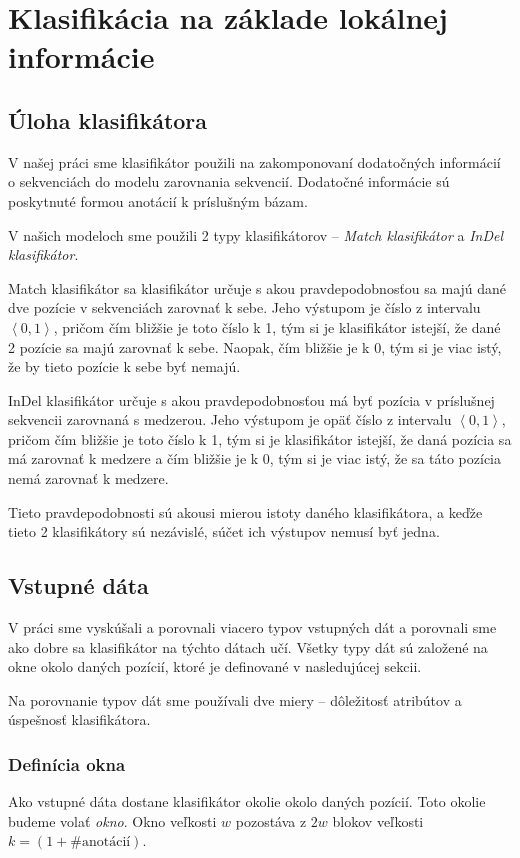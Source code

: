 \chapter[Klasifikácia]{Klasifikácia na základe lokálnej informácie}

\section{Úloha klasifikátora}

V našej práci sme klasifikátor použili na zakomponovaní dodatočných informácií o sekvenciách do modelu zarovnania sekvencií. Dodatočné informácie sú poskytnuté formou anotácií k príslušným bázam.

V našich modeloch sme použili 2 typy klasifikátorov -- \textit{Match klasifikátor} a \textit{InDel klasifikátor}.

Match klasifikátor sa klasifikátor určuje s akou pravdepodobnosťou sa majú dané dve pozície v sekvenciách zarovnať k sebe. Jeho výstupom je číslo z intervalu $\left<0,1\right>$, pričom čím bližšie je toto číslo k 1, tým si je klasifikátor istejší, že dané 2 pozície sa majú zarovnať k sebe. Naopak, čím bližšie je k 0, tým si je viac istý, že by tieto pozície k sebe byť nemajú.

InDel klasifikátor určuje s akou pravdepodobnosťou má byť pozícia v príslušnej sekvencii zarovnaná s medzerou. Jeho výstupom je opäť  číslo z intervalu $\left<0,1\right>$, pričom čím bližšie je toto číslo k 1, tým si je klasifikátor istejší, že daná pozícia sa má zarovnať k medzere a čím bližšie je k 0, tým si je viac istý, že sa táto pozícia nemá zarovnať k medzere.

Tieto pravdepodobnosti sú akousi mierou istoty daného klasifikátora, a keďže tieto 2 klasifikátory sú nezávislé, súčet ich výstupov nemusí byť jedna.

\section{Vstupné dáta}

V práci sme vyskúšali a porovnali viacero typov vstupných dát a porovnali sme ako dobre sa klasifikátor na týchto dátach učí. Všetky typy dát sú založené na okne okolo daných pozícií, ktoré je definované v nasledujúcej sekcii.

Na porovnanie typov dát sme používali dve miery -- dôležitosť atribútov a úspešnosť klasifikátora.

\subsection{Definícia okna}
\label{subsec:window}
Ako vstupné dáta dostane klasifikátor okolie okolo daných pozícií. Toto okolie budeme volať \textit{okno}. Okno veľkosti $w$ pozostáva z $2w$ blokov veľkosti $k = (1+\#\text{anotácií})$.

